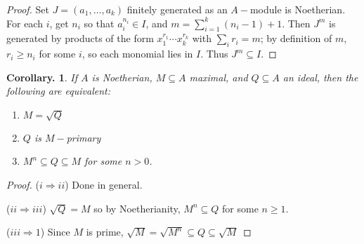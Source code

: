 \documentclass[11pt, a4paper]{memoir}
\newcommand{\imp}[2]{($#1\Rightarrow#2$)\hspace{0.2cm}}
\theoremstyle{change}
\newtheorem{corollary}[theorem]{Corollary.}
\theoremstyle{plain}
\theoremstyle{nonumberplain}
\newtheorem{proof}{Proof}
\numberwithin{equation}{section}
\begin{document}
\begin{proof}
    Set $J=(a_1,\ldots,a_k)$ finitely generated as an $A-$module is Noetherian.
    For each $i$, get $n_i$ so that $a_i^{n_i}\in I$, and $m=\sum_{i=1}^k(n_i-1)+1$.
    Then $J^m$ is generated by products of the form $x_1^{r_1}\cdots x_k^{r_k}$ with $\sum_i r_i=m$; by definition of $m$, $r_i\geq n_i$ for some $i$, so each monomial lies in $I$.
    Thus $J^m\subseteq I$.
\end{proof}
\begin{corollary}
    If $A$ is Noetherian, $M\subseteq A$ maximal, and $Q\subseteq A$ an ideal, then the following are equivalent:
    \begin{enumerate}[nl,r]
        \item $M=\sqrt{Q}$
        \item $Q$ is $M-$primary
        \item $M^n\subseteq Q\subseteq M$ for some $n>0$.
    \end{enumerate}
\end{corollary}
\begin{proof}
    \imp{i}{ii}
    Done in general.

    \imp{ii}{iii}
    $\sqrt{Q}= M$ so by Noetherianity, $M^n\subseteq Q$ for some $n\geq 1$.

    \imp{iii}{1}
    Since $M$ is prime, $\sqrt{M}=\sqrt{M^n}\subseteq Q\subseteq\sqrt{M}$
\end{proof}
\end{document}
